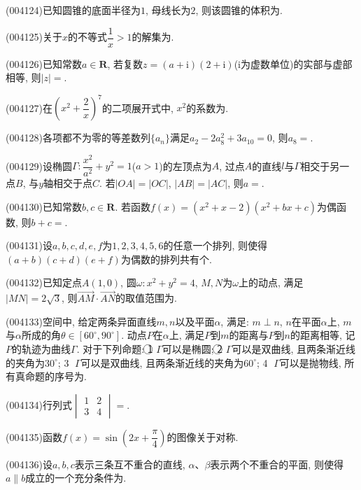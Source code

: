 \item (004124)已知圆锥的底面半径为$1$, 母线长为$2$, 则该圆锥的体积为.
\item (004125)关于$x$的不等式$\dfrac{1}{x}>1$的解集为.
\item (004126)已知常数$a\in \mathbf{R}$, 若复数$z=(a+\mathrm{i})(2+\mathrm{i})$($\mathrm{i}$为虚数单位)的实部与虚部相等, 则$|z|=$.
\item (004127)在$(x^2+\dfrac 2x)^7$的二项展开式中, $x^2$的系数为.
\item (004128)各项都不为零的等差数列$\{a_n\}$满足$a_2-2a_8^2+3a_{10}=0$, 则$a_8=$.
\item (004129)设椭圆$\Gamma:\dfrac{x^2}{a^2}+y^2=1$($a>1$)的左顶点为$A$, 过点$A$的直线$l$与$\Gamma$相交于另一点$B$, 与$y$轴相交于点$C$. 若$|OA|=|OC|$, $|AB|=|AC|$, 则$a=$.
\item (004130)已知常数$b,c\in \mathbf{R}$. 若函数$f(x)=(x^2+x-2)(x^2+bx+c)$为偶函数, 则$b+c=$.
\item (004131)设$a,b,c,d,e,f$为$1,2,3,4,5,6$的任意一个排列, 则使得$(a+b)(c+d)(e+f)$为偶数的排列共有个.
\item (004132)已知定点$A(1,0)$, 圆$\omega:x^2+y^2=4$, $M,N$为$\omega$上的动点, 满足$|MN|=2\sqrt{3}$, 则$\overrightarrow{AM}\cdot \overrightarrow{AN}$的取值范围为.
\item (004133)空间中, 给定两条异面直线$m,n$以及平面$\alpha$, 满足: $m\perp n$, $n$在平面$\alpha$上, $m$与$\alpha$所成的角$\theta\in [60^\circ,90^\circ]$. 动点$P$在$\alpha$上, 满足$P$到$m$的距离与$P$到$n$的距离相等, 记$P$的轨迹为曲线$\Gamma$. 对于下列命题: \textcircled{1} $\Gamma$可以是椭圆; \textcircled{2} $\Gamma$可以是双曲线, 且两条渐近线的夹角为$30^\circ$; \textcircled{3} $\Gamma$可以是双曲线, 且两条渐近线的夹角为$60^\circ$; \textcircled{4} $\Gamma$可以是抛物线, 所有真命题的序号为.
\item (004134)行列式$\begin{vmatrix}1 & 2 \\ 3 & 4\end{vmatrix}=$.
\item (004135)函数$f(x)=\sin(2x+\dfrac\pi 4)$的图像关于对称.
\item (004136)设$a,b,c$表示三条互不重合的直线, $\alpha$、$\beta$表示两个不重合的平面, 则使得$a\parallel b$成立的一个充分条件为.
